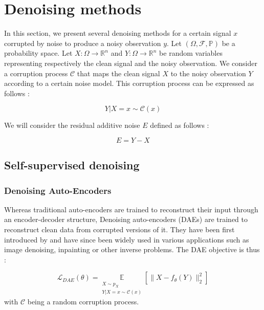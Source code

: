 \section{Denoising methods}

In this section, we present several denoising methods for a certain signal $x$ corrupted by noise to produce a noisy observation $y$.
Let $(\Omega, \mathcal{F}, \mathbb{P})$ be a probability space.
Let $X : \Omega \to \mathbb{R}^n$ and $Y : \Omega \to \mathbb{R}^n$ be random variables representing respectively the clean signal and the noisy observation.
We consider a corruption process $\mathcal{C}$ that maps the clean signal $X$ to the noisy observation $Y$ according to a certain noise model. This corruption process can be expressed as follows :

\begin{equation}
    Y | X=x \sim \mathcal{C}(x)
    \label{eq:noise-model}
\end{equation}

We will consider the residual additive noise $E$ defined as follows :

\begin{equation}
    E = Y - X
\end{equation}

\subsection{Self-supervised denoising}

\subsubsection{Denoising Auto-Encoders}

Whereas traditional auto-encoders are trained to reconstruct their input through an encoder-decoder structure, Denoising auto-encoders (DAEs) are trained to reconstruct clean data from corrupted versions of it.
They have been first introduced by \cite{vincent_extracting_2008} and have since been widely used in various applications such as image denoising, inpainting or other inverse problems.
The DAE objective is thus :

\begin{equation}
    \mathcal{L}_{DAE}(\theta) = \underset{\substack{X \sim p_X \\ Y | X=x \sim \mathcal{C}(x)}}{\mathbb{E}} \left[ \| X - f_{\theta}(Y) \|_2^2 \right]
\end{equation}
with $\mathcal{C}$ being a random corruption process.

